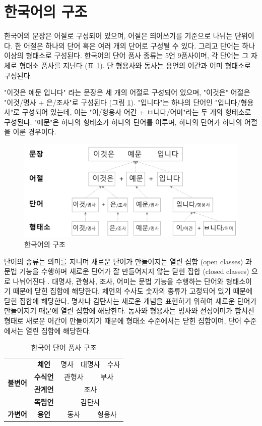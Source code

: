 \documentclass[oneside, ko,phd]{snuthesis_utf8_kor}
\begin{document}
\section{한국어의 구조}

한국어의 문장은 어절로 구성되어 있으며, 어절은 띄어쓰기를 기준으로 나뉘는 단위이다.
한 어절은 하나의 단어 혹은 여러 개의 단어로 구성될 수 있다.
그리고 단어는 하나 이상의 형태소로 구성된다.
한국어의 단어 품사 종류는 5언 9품사이며, 각 단어는 그 자체로 형태소 품사를 지닌다 (표 \ref{tab:korean_tag}).
단 형용사와 동사는 용언의 어간과 어미 형태소로 구성된다.

"이것은 예문 입니다" 라는 문장은 세 개의 어절로 구성되어 있으며, "이것은" 어절은 "이것/명사 + 은/조사"로 구성된다  (그림 \ref{tab:korean_tag}).
"입니다"는 하나의 단어인 "입니다/형용사"로 구성되어 있는데, 이는 "이/형용사 어간 + ㅂ니다/어미"라는 두 개의 형태소로 구성된다.
"예문"은 하나의 형태소가 하나의 단어를 이루며, 하나의 단어가 하나의 어절을 이룬 경우이다.

\begin{figure}[H]
\centering
\includegraphics[keepaspectratio=true, width=0.6\linewidth]{fig/korean_structure.png}
\caption{한국어의 구조}
\label{fig:korean_structure}
\end{figure}

단어의 종류는 의미를 지니며 새로운 단어가 만들어지는 열린 집합 (open classes) 과 문법 기능을 수행하며 새로운 단어가 잘 만들어지지 않는 닫힌 집합 (closed classes) 으로 나뉘어진다 \cite{jurafsky2000speech}.
대명사, 관형사, 조사, 어미는 문법 기능을 수행하는 단어와 형태소이기 때문에 닫힌 집합에 해당한다.
체언의 수사도 숫자의 종류가 고정되어 있기 때문에 닫힌 집합에 해당한다.
명사나 감탄사는 새로운 개념을 표현하기 위하여 새로운 단어가 만들어지기 때문에 열린 집합에 해당한다.
동사와 형용사는 명사와 전성어미가 합쳐진 형태로 새로운 어간이 만들어지기 때문에 형태소 수준에서는 닫힌 집합이며, 단어 수준에서는 열린 집합에 해당한다.

\begin{table}[H]
\centering
\begin{tabular}{|c|c|c|l|c|c|c|l|}
\hline
\multirow{4}{*}{\textbf{불변어}} & \textbf{체언} & \multicolumn{2}{c|}{명사} & \multicolumn{2}{c|}{대명사} & \multicolumn{2}{c|}{수사} \\ \cline{2-8} 
 & \textbf{수식언} & \multicolumn{3}{c|}{관형사} & \multicolumn{3}{c|}{부사} \\ \cline{2-8} 
 & \textbf{관계언} & \multicolumn{6}{c|}{조사} \\ \cline{2-8} 
 & \textbf{독립언} & \multicolumn{6}{c|}{감탄사} \\ \hline
\textbf{가변어} & \textbf{용언} & \multicolumn{3}{c|}{동사} & \multicolumn{3}{c|}{형용사} \\ \hline
\end{tabular}
\caption{한국어 단어 품사 구조}
\label{tab:korean_tag}
\end{table}
\end{document}
